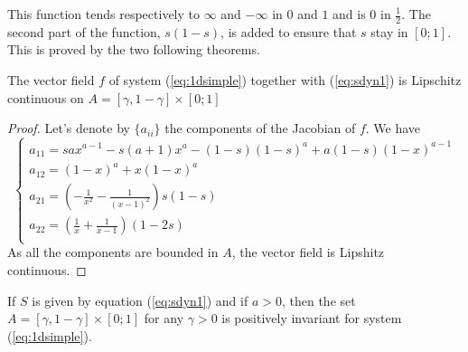 \documentclass{article}
\begin{document}
This function tends respectively to $\infty$ and $-\infty$ in $0$ and $1$ and is $0$ in $\frac{1}{2}$.
The second part of the function, $s(1-s)$, is added to ensure that $s$ stay in $[0;1]$.
This is proved by the two following theorems. \\

\begin{theorem}{}
The vector field $f$ of system (\ref{eq:1dsimple}) together with (\ref{eq:sdyn1}) is Lipschitz continuous on $A = [\gamma, 1-\gamma] \times [0;1]$
\end{theorem}

\begin{proof}
Let's denote by $\{ a_{ii}\}$ the components of the Jacobian of $f$.
We have
\begin{equation}
\label{eq:jacob}
\begin{cases}
a_{11} = sax^{a-1} - s(a+1)x^a - (1-s)(1-s)^a + a(1-s)(1-x)^{a-1} \\
a_{12} = (1-x)^a + x(1-x)^a \\
a_{21} = (-\frac{1}{x^2}-\frac{1}{(x-1)^2})s(1-s) \\
a_{22} = (\frac{1}{x}+\frac{1}{x-1})(1-2s) \\
\end{cases}
\end{equation}
As all the components are bounded in $A$, the vector field is Lipshitz continuous.
\end{proof}

\begin{theorem}{}
\label{posinv}
If $S$ is given by equation (\ref{eq:sdyn1}) and if $a>0$, then the set $A = [\gamma, 1-\gamma] \times [0;1]$ for any $\gamma > 0$ is positively invariant for system (\ref{eq:1dsimple}).
\end{theorem}
\end{document}
